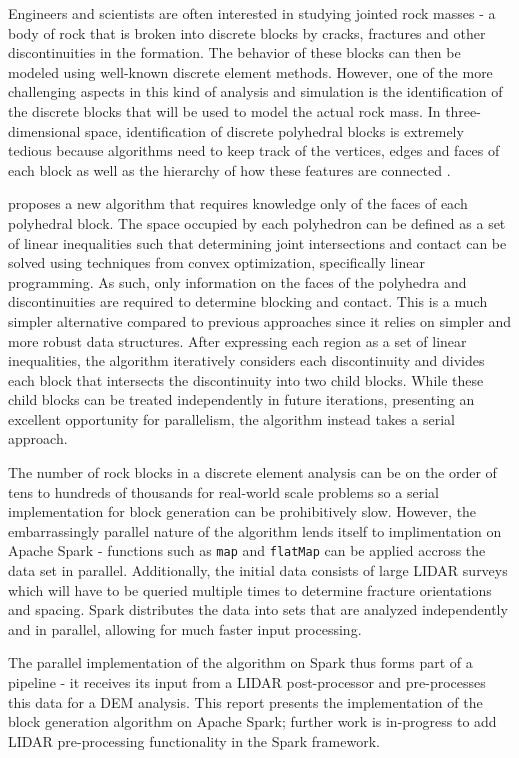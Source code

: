 Engineers and scientists are often interested in studying jointed rock masses - a body of rock that is broken into discrete blocks by cracks, fractures and other discontinuities in the formation. The behavior of these blocks can then be modeled using well-known discrete element methods. However, one of the more challenging aspects in this kind of analysis and simulation is the identification of the discrete blocks that will be used to model the actual rock mass. In three-dimensional space, identification of discrete polyhedral blocks is extremely tedious because algorithms need to keep track of the vertices, edges and faces of each block as well as the hierarchy of how these features are connected \cite{slicing}. \par

\cite{slicing} proposes a new algorithm that requires knowledge only of the faces of each polyhedral block. The space occupied by each polyhedron can be defined as a set of linear inequalities such that determining joint intersections and contact can be solved using techniques from convex optimization, specifically linear programming. As such, only information on the faces of the polyhedra and discontinuities are required to determine blocking and contact. This is a much simpler alternative compared to previous approaches since it relies on simpler and more robust data structures. After expressing each region as a set of linear inequalities, the algorithm iteratively considers each discontinuity and divides each block that intersects the discontinuity into two child blocks. While these child blocks can be treated independently in future iterations, presenting an excellent opportunity for parallelism, the algorithm instead takes a serial approach. \par

The number of rock blocks in a discrete element analysis can be on the order of tens to hundreds of thousands for real-world scale problems so a serial implementation for block generation can be prohibitively slow. However, the embarrassingly parallel nature of the algorithm lends itself to implimentation on Apache Spark - functions such as \texttt{map} and \texttt{flatMap} can be applied accross the data set in parallel. Additionally, the initial data consists of large LIDAR surveys which will have to be queried multiple times to determine fracture orientations and spacing. Spark distributes the data into sets that are analyzed independently and in parallel, allowing for much faster input processing. \par

The parallel implementation of the \cite{slicing} algorithm on Spark thus forms part of a pipeline - it receives its input from a LIDAR post-processor and pre-processes this data for a DEM analysis. This report presents the implementation of the block generation algorithm on Apache Spark; further work is in-progress to add LIDAR pre-processing functionality in the Spark framework.
